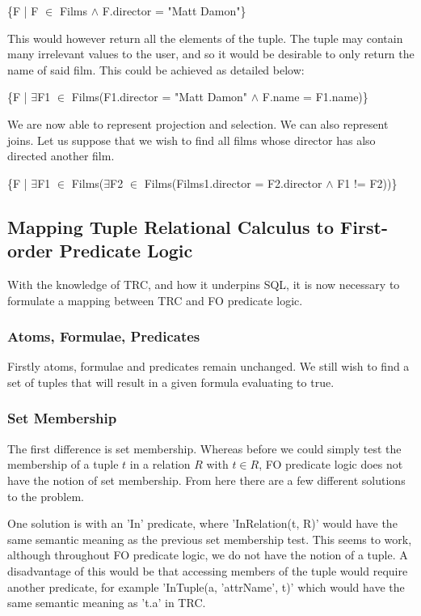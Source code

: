 \documentclass[a4wide, 11pt]{article}
\begin{document}
\{F | F $\in$ Films $\land$ F.director = "Matt Damon"\}

This would however return all the elements of the tuple. The tuple may contain
many irrelevant values to the user, and so it would be desirable to only return
the name of said film. This could be achieved as detailed below:

\{F | $\exists$F1 $\in$ Films(F1.director = "Matt Damon" $\land$ F.name =
F1.name)\}

We are now able to represent projection and selection. We can also represent
joins. Let us suppose that we wish to find all films whose director has also
directed another film.

\{F | $\exists$F1 $\in$ Films($\exists$F2 $\in$ Films(Films1.director =
F2.director $\land$ F1 != F2))\}

\subsection{Mapping Tuple Relational Calculus to First-order Predicate Logic}

With the knowledge of TRC, and how it underpins SQL, it is now necessary to
formulate a mapping between TRC and FO predicate logic.

\subsubsection{Atoms, Formulae, Predicates}

Firstly atoms, formulae and predicates remain unchanged. We still wish to find
a set of tuples that will result in a given formula evaluating to true.

\subsubsection{Set Membership}

The first difference is set membership. Whereas before we could simply test the
membership of a tuple $t$ in a relation $R$ with $t \in R$, FO predicate logic
does not have the notion of set membership. From here there are a few different
solutions to the problem. 

One solution is with an 'In' predicate, where 
'InRelation(t, R)' would have the same semantic meaning as the previous set membership 
test. This seems to work, although throughout FO predicate logic, we do not
have the notion of a tuple. A disadvantage of this would be that accessing
members of the tuple would require another predicate, for example 'InTuple(a,
'attrName', t)' which would have the same semantic meaning as 't.a' in TRC.
\end{document}
